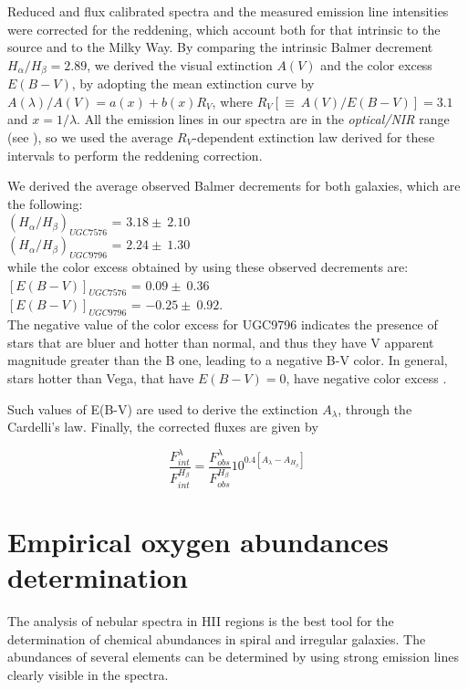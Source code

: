\documentclass{aa}
\begin{document}
Reduced and flux calibrated spectra and the measured emission line
intensities were corrected for the reddening, which account both for
that intrinsic to the source and to the Milky Way. By comparing the
intrinsic Balmer decrement $H_{\alpha}/H_{\beta}=2.89$, we derived the
visual extinction $A(V)$ and the color excess $E(B-V)$, by adopting
the mean extinction curve by \cite{Card89} $A(\lambda)/A(V) =
a(x)+b(x)R_{V}$, where $R_{V}[\equiv\ A(V)/E(B-V)]=3.1$ and
$x=1/\lambda$. All the emission lines in our spectra are in the
\emph{optical/NIR} range (see \citealt{Card89}), so we used the average
$R_{V}$-dependent extinction law derived for these intervals to
perform the reddening correction.

We derived the average observed Balmer decrements for both galaxies,
which are the following:\\ $(H_{\alpha}/H_{\beta})_{UGC7576}$ = $3.18
\pm\ 2.10$\\ $(H_{\alpha}/H_{\beta})_{UGC9796}$ = $2.24
\pm\ 1.30$\\ while the color excess obtained by using these observed
decrements are:\\ $[E(B-V)]_{UGC7576}$ = $0.09
\pm\ 0.36$\\ $[E(B-V)]_{UGC9796}$ = $-0.25 \pm\ 0.92$.\\ The
  negative value of the color excess for UGC9796 indicates the
  presence of stars that are bluer and hotter than normal, and thus
  they have V apparent magnitude greater than the B one, leading to a
  negative B-V color. In general, stars hotter than Vega, that have
  $E(B-V)=0$, have negative color excess \citep{Mas98}.

Such values of E(B-V) are used to derive the extinction $A_{\lambda}$,
through the Cardelli's law. Finally, the corrected fluxes are given by

\begin{equation}
\frac{F^{\lambda}_{int}} { F^{H_{\beta}}_{int}} = \frac{F^{\lambda}_{obs}}  {F^{H_{\beta}}_{obs}} 10^{0.4[A_{\lambda}-A_{H_{\beta}}]}
\end{equation}

\section{Empirical oxygen abundances determination}\label{oxy}

The analysis of nebular spectra in HII regions is the best tool for
the determination of chemical abundances in spiral and irregular
galaxies. The abundances of several elements can be determined by
using strong emission lines clearly visible in the spectra.
\end{document}
